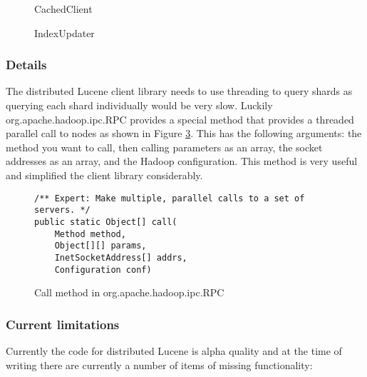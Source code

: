 \documentclass[a4paper,10pt]{article}
\begin{document}
\begin{figure}

\caption{CachedClient}
\label{CachedClient}
\end{figure}

\begin{figure}

\caption{IndexUpdater}
\label{IndexUpdater}
\end{figure}

\subsubsection{Details}
The distributed Lucene client library needs to use threading to query shards as querying each shard individually would be very slow. Luckily org.apache.hadoop.ipc.RPC provides a special method that provides a threaded parallel call to nodes as shown in Figure \ref{ipc.RPC}. This has the following arguments: the method you want to call, then calling parameters as an array, the socket addresses as an array, and the Hadoop configuration. This method is very useful and simplified the client library considerably. 

\begin{figure}
\begin{lstlisting}
/** Expert: Make multiple, parallel calls to a set of servers. */
public static Object[] call(
	Method method, 
	Object[][] params,
	InetSocketAddress[] addrs, 
	Configuration conf)
\end{lstlisting}
\caption{Call method in org.apache.hadoop.ipc.RPC}
\label{ipc.RPC}
\end{figure}

\subsubsection{Current limitations}

Currently the code for distributed Lucene is alpha quality and at the time of writing there are currently a number of items of missing functionality:
\end{document}
